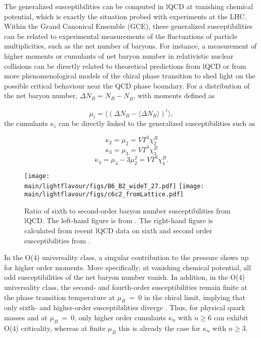 \noindent The generalized susceptibilities can be computed in lQCD at vanishing chemical potential, which is exactly the situation probed with experiments at the LHC. Within the Grand Canonical Ensemble (GCE), these generalized susceptibilities can be related to experimental measurements of the fluctuations of particle multiplicities, such as the net number of baryons. For instance, a measurement of higher moments or cumulants of net baryon number in relativistic nuclear collisions can be directly related \cite{Karsch:2010ck,Skokov:2012ds,Karsch:2012wm,Karsch:2017mvg,Borsanyi:2013hza,Borsanyi:2014ewa} to theoretical predictions from lQCD or from more phenomenological models of the chiral phase transition \cite{Almasi:2017bhq,Parotto:2018pwx} to shed light on the possible critical behaviour near the QCD phase boundary. 
For a distribution of the net baryon number, $\Delta N_B = N_B - N_{\overline{B}}$, with moments defined as 

\begin{equation}
\mu_i = \langle (\Delta N_B - \langle \Delta N_B \rangle )^i \rangle ,
\end{equation}
the cumulants $\kappa_i$ can be directly linked to the generalized susceptibilities such as

\begin{equation}
\kappa_2 = \mu_2 = VT^3 \chi_2^B
\end{equation}
\begin{equation}
\kappa_3 = \mu_3 = VT^3 \chi_3^B  
\end{equation}
\begin{equation}
\kappa_4 = \mu_4 - 3\mu_2^2 = VT^3 \chi_4^B.
\end{equation}


\begin{figure}[h]
\begin{center}
\texttt{[image: \\main/lightflavour/figs/B6\_B2\_wideT\_27.pdf]}
\texttt{[image: \\main/lightflavour/figs/c6c2\_fromLattice.pdf]}
\end{center}
\caption{Ratio of sixth to second-order baryon number susceptibilities from lQCD. The left-hand figure is from \cite{Bazavov:2017dus}. The right-hand figure is calculated from recent lQCD data on  sixth and  second  order susceptibilities from \cite{Borsanyi:2018grb}. }  
\label{fig:chi62}
\end{figure}

In the O(4) universality class, a singular contribution to the pressure shows up for higher order  moments.
More specifically, at vanishing chemical potential, all odd susceptibilities of the net baryon number vanish.  
In addition, in the O(4) universality class, the second- and fourth-order susceptibilities remain finite  at  the  phase  transition  temperature  at $\mu_B~=~0$  in  the  chiral  limit,
implying  that  only  sixth-  and  higher-order  susceptibilities  diverge \cite{Ejiri:2005wq,Friman:2011pf}. Thus, for  physical  quark  masses and at $\mu_B~=~0$, only higher order cumulants $\kappa_n$ with $n\geq 6$ can exhibit O(4) criticality,  whereas at finite $\mu_B$ this is already the case for $\kappa_n$ with $n\geq 3$.  

